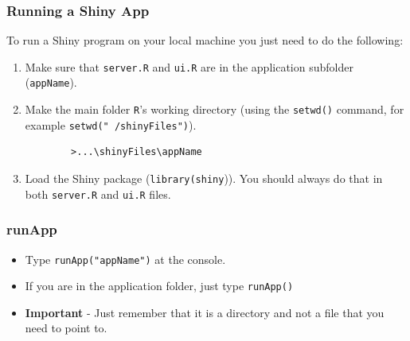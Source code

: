 \documentclass{beamer}
\begin{document}
\begin{frame}[fragile]
	\frametitle{Running a Shiny App}
	\Large
	To run a Shiny program on your local machine you just need to do the following:
	\begin{enumerate}
		\item  Make sure that \texttt{server.R} and \texttt{ui.R} are in the application subfolder (\texttt{appName}).
		\item Make the main folder \texttt{R}'s working directory (using the \texttt{setwd()} command, for
		example \texttt{setwd("~/shinyFiles")}).
		\begin{verbatim}
		>...\shinyFiles\appName
		\end{verbatim}
		\item Load the Shiny package (\texttt{library(shiny})). You
		should always do that in both \texttt{server.R} and \texttt{ui.R} files.
	\end{enumerate}
	
	
\end{frame}
\begin{frame}
	\frametitle{runApp}
	\Large
	\vspace{-1.5cm}
	\begin{itemize}
		\item Type \texttt{runApp("appName")} at the console.
		\item If you are in the application folder, just type \texttt{runApp()}
		\item \textbf{Important} - Just remember that it is a directory
		and not a file that you need to point to.
	\end{itemize}
\end{frame}
\end{document}
